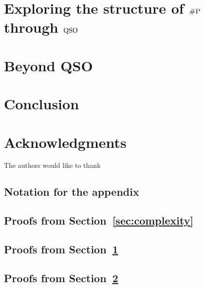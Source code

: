 \documentclass[conference]{IEEEtran}
\begin{document}
\section{Exploring the structure of $\text{\sc \#P}$ through ${\rm QSO}$} \label{sec:syntactic}


\section{Beyond QSO}\label{sec:beyond}


\section{Conclusion}



\section*{Acknowledgments}
The authors would like to thank ~\cite{DrosteG07}






\newpage

\onecolumn
\appendix

\subsection{Notation for the appendix}


\bigskip

\subsection{Proofs from Section~\ref{sec:complexity}}


\subsection{Proofs from Section~\ref{sec:syntactic}}


\subsection{Proofs from Section~\ref{sec:beyond}}

\end{document}
